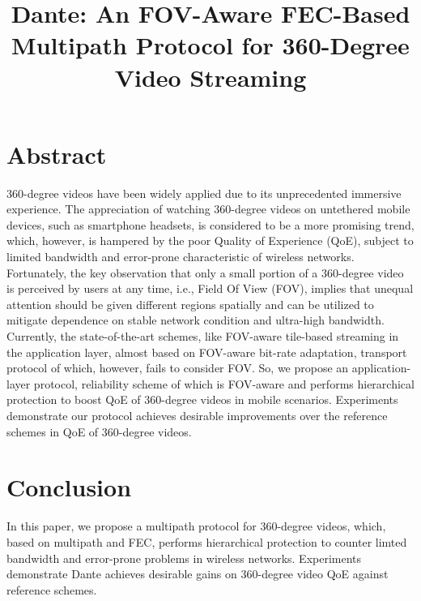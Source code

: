 \documentclass{apnet18}
\begin{document}
 {}
\date{}


\title{Dante: An FOV-Aware FEC-Based Multipath Protocol for 360-Degree Video Streaming}

\maketitle



	
\section*{Abstract}

360-degree videos have been widely applied due to its unprecedented immersive experience. The appreciation of watching 360-degree videos
on untethered mobile devices, such as smartphone headsets,
is considered to be a more promising trend, which, however, is hampered by the
poor Quality of Experience (QoE), subject to limited bandwidth and error-prone characteristic of wireless networks.
Fortunately, the key observation that only a small portion of a 360-degree video is
perceived by users at any time, i.e., Field Of View (FOV), implies that unequal attention
should be given different regions spatially and can
be utilized to mitigate dependence on stable network condition and ultra-high bandwidth. Currently, the state-of-the-art schemes, like FOV-aware tile-based streaming in the application layer, almost based on FOV-aware bit-rate adaptation, transport protocol of which, however, fails to consider FOV. So, we propose an application-layer protocol, reliability scheme of which is FOV-aware and performs hierarchical protection to boost QoE of 360-degree videos in mobile scenarios. Experiments demonstrate our protocol achieves desirable improvements over the reference schemes in QoE of 360-degree videos.










\section{Conclusion}
In this paper, we propose a multipath protocol for 360-degree videos, which, based on multipath and FEC, performs hierarchical protection to counter limted bandwidth and error-prone problems in wireless networks. Experiments demonstrate Dante achieves desirable gains on 360-degree video QoE against reference schemes.  
\end{document}
